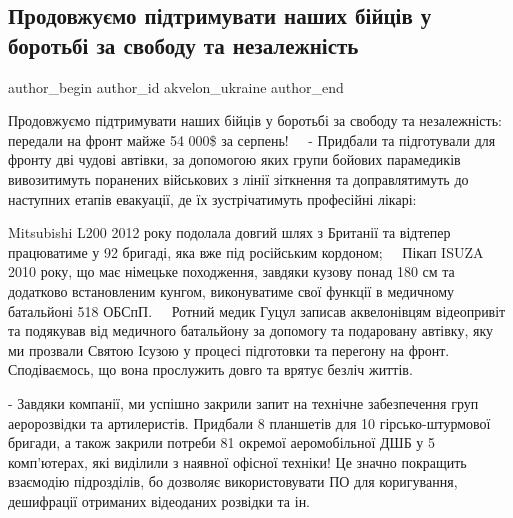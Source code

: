  
 
 
 
 

\subsection{Продовжуємо підтримувати наших бійців у боротьбі за свободу та незалежність}
\label{sec:26_09_2022.fb.akvelon_ukraine.1.prodovzhu_mo_p_dtrim}

\ifcmt
 author_begin
   author_id akvelon_ukraine
 author_end
\fi

Продовжуємо підтримувати наших бійців у боротьбі за свободу та незалежність:
передали на фронт майже 54 000\$ за серпень!
⠀
- Придбали та підготували для фронту дві чудові автівки, за допомогою яких
групи бойових парамедиків вивозитимуть поранених військових з лінії зіткнення
та доправлятимуть до наступних етапів евакуації, де їх зустрічатимуть
професійні лікарі: ⠀

Mitsubishi L200 2012 року подолала довгий шлях з Британії та відтепер
працюватиме у 92 бригаді, яка вже під російським кордоном;
⠀
Пікап ISUZA 2010 року, що має німецьке походження, завдяки кузову понад 180 см
та додатково встановленим кунгом, виконуватиме свої функції в медичному
батальйоні 518 ОБСпП.
⠀
Ротний медик Гуцул записав аквелонівцям відеопривіт та подякував від медичного
батальйону за допомогу та подаровану автівку, яку ми прозвали Святою Ісузою у
процесі підготовки та перегону на фронт. Сподіваємось, що вона прослужить довго
та врятує безліч життів.  ⠀

- Завдяки компанії, ми успішно закрили запит на технічне забезпечення груп
аеророзвідки та артилеристів. Придбали 8 планшетів для 10 гірсько-штурмової
бригади, а також закрили потреби 81 окремої аеромобільної ДШБ у 5 комп'ютерах,
які виділили з наявної офісної техніки! Це значно покращить взаємодію
підрозділів, бо дозволяє використовувати ПО для коригування, дешифрації
отриманих відеоданих розвідки та ін.

